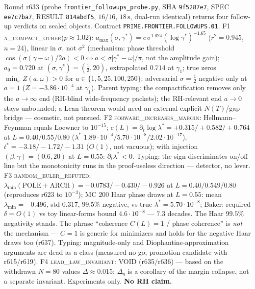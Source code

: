 \documentclass[11pt]{article}
\theoremstyle{definition}
\theoremstyle{remark}
\begin{document}
\noindent Round r633 (probe \texttt{frontier\_followups\_probe.py},
SHA \texttt{9f5287e7}, SPEC \texttt{ee7c7ba7}, RESULT
\texttt{814abdf5}, $16/16$, $18\,\mathrm{s}$, dual-run
identical) returns four follow-up verdicts on sealed objects.
Contract \texttt{PRIME.FRONTIER.FOLLOWUPS.01}.
F1 \textsc{a\_compact\_other}($p\approx 1.02$):
$a_{\max}(\sigma,\gamma^*)=c\,\sigma^{1.024}(\log\gamma^*)^{-1.65}$
($r^2=0.945$, $n=24$), linear in $\sigma$, not $\sigma^2$
(mechanism: phase threshold
$\cos(\sigma(\gamma-\omega)/2a)<0\Leftrightarrow
a<\sigma\lvert\gamma^*-\omega\rvert/\pi$, not the amplitude
gain); $a_0=0.720$ at $(\sigma,\gamma^*)=(\tfrac12,20)$,
extrapolated $0.714$ at $\gamma_1$; true zeros
$\min_\omega Z(a,\omega)>0$ for
$a\in\{1,5,25,100,250\}$; adversarial $\sigma=\tfrac12$
negative only at $a=1$ ($Z=-3.86\cdot10^{-4}$ at $\gamma_1$).
Parent typing: the compactification removes only the
$a\to\infty$ end (RH-blind wide-frequency packets); the
RH-relevant end $a\to 0$ stays unbounded; a Lean theorem
would need an external explicit $N(T)$/gap bridge ---
cosmetic, not pursued.
F2 \textsc{forward\_increases\_margin}: Hellmann--Feynman
equals Loewner to $10^{-15}$;
$c(L)=\partial_t\log\lambda^*=+0.315/+0.582/+0.764$ at
$L=0.40/0.55/0.80$ ($\lambda^*$
$1.89\cdot10^{-4}/5.70\cdot10^{-8}/2.02\cdot10^{-17}$),
$t^*=-3.18/-1.72/-1.31$ ($O(1)$, not vacuous); with
injection $(\beta,\gamma)=(0.6,20)$ at $L=0.55$:
$\partial_t\lambda^*<0$.  Typing: the sign discriminates
on/off-line but the monotonicity runs in the proof-useless
direction --- detector, no lever.
F3 \textsc{random\_euler\_refuted}:
$\lambda_{\min}(\mathrm{POLE}+\mathrm{ARCH})=-0.0783/-0.430/-0.926$
at $L=0.40/0.549/0.80$ (reproduces r623 to $10^{-3}$);
MC $200$ Haar phase draws at $L=0.55$: mean
$\lambda_{\min}=-0.496$, std $0.317$, $99.5\%$ negative, vs
true $\lambda^*=5.70\cdot10^{-8}$; Baker: required
$\delta=O(1)$ vs toy linear-forms bound $4.6\cdot10^{-8}$ ---
$7.3$ decades.  The Haar $99.5\%$ negativity stands.
The phrase ``coherence $C(L)=1$ / phase coherence'' is
\emph{not} the mechanism --- $C=1$ is generic for
minimizers and holds for the negative Haar draws too
(r637).  Typing: magnitude-only and Diophantine-approximation
arguments are dead as a class (measured no-go; promotion
candidate with r615/r619).
F4 \textsc{lead\_law\_invariant}: VOID (r635/r636) ---
based on the withdrawn $N=80$ values $\Delta\approx 0.015$;
$\Delta_q$ is a corollary of the margin collapse, not a
separate invariant.
Experiments only.  \textbf{No RH claim.}
\end{document}
